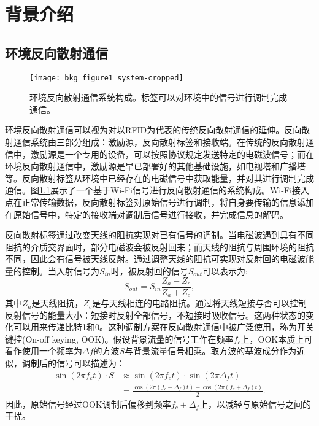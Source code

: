 \chapter{背景介绍}
\label{chap:background}
\section{环境反向散射通信}
\begin{figure}
	\centering
	\texttt{[image: bkg\_figure1\_system-cropped]}
	\caption{环境反向散射通信系统构成。标签可以对环境中的信号进行调制完成通信。}
	\label{fig:system}
\end{figure}
环境反向散射通信可以视为对以RFID为代表的传统反向散射通信的延伸。反向散射通信系统由三部分组成：激励源，反向散射标签和接收端。在传统的反向散射通信中，激励源是一个专用的设备，可以按照协议规定发送特定的电磁波信号；而在环境反向散射通信中，激励源是早已部署好的其他基础设施，如电视塔和广播塔等。反向散射标签从环境中已经存在的电磁信号中获取能量，并对其进行调制完成通信。图\ref{fig:system}展示了一个基于Wi-Fi信号进行反向散射通信的系统构成。Wi-Fi接入点在正常传输数据，反向散射标签对原始信号进行调制，将自身要传输的信息添加在原始信号中，特定的接收端对调制后信号进行接收，并完成信息的解码。

反向散射标签通过改变天线的阻抗实现对已有信号的调制。当电磁波遇到具有不同阻抗的介质交界面时，部分电磁波会被反射回来；而天线的阻抗与周围环境的阻抗不同，因此会有信号被天线反射。通过调整天线的阻抗可实现对反射回的电磁波能量的控制。当入射信号为$S_{in}$时，被反射回的信号$S_{out}$可以表示为:
\begin{equation}
S_{out} = S_{in} \frac{Z_a - Z_c}{Z_a + Z_c},
\end{equation}
其中$Z_a$是天线阻抗，$Z_c$是与天线相连的电路阻抗。通过将天线短接与否可以控制反射信号的能量大小：短接时反射全部信号，不短接时吸收信号。这两种状态的变化可以用来传递比特1和0。这种调制方案在反向散射通信中被广泛使用，称为开关键控(On-off keying, OOK)。假设背景流量的信号工作在频率$f_c$上，OOK本质上可看作使用一个频率为$\Delta f$的方波$S$与背景流量信号相乘。取方波的基波成分作为近似，调制后的信号可以描述为：
\begin{equation}
\begin{split}
	\sin(2\pi f_c t)\cdot S &\approx \sin(2\pi f_c t)\cdot \sin(2\pi \Delta_f t)\\
	& =\frac{\cos (2\pi (f_c - \Delta_f)t) - \cos (2\pi (f_c + \Delta_f)t)}{2}.
\end{split}
\end{equation}
因此，原始信号经过OOK调制后偏移到频率$f_c \pm \Delta_f$上，以减轻与原始信号之间的干扰。


